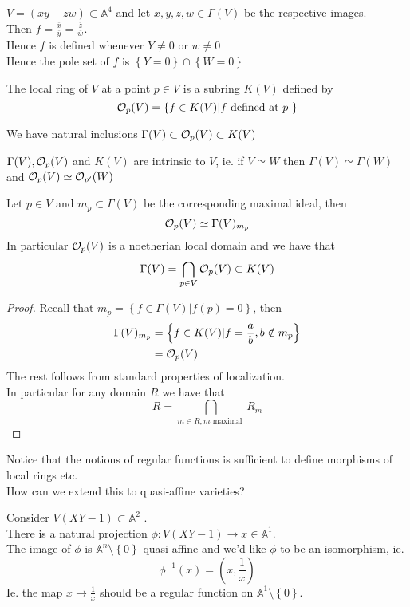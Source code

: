 \documentclass[../main.tex]{subfiles}
\begin{document}
\begin{exemple}
$V= ( xy-zw) \subset \mathbb{A}^{4}$ and let $ \overline{x}, \overline{y}, \overline{z},\overline{w}\in\Gamma( V) $ be the respective images.\\
Then $f= \frac{\overline{x}}{\overline{y}}= \frac{\overline{z}}{\overline{w}}$.\\
Hence $f$ is defined whenever $Y\neq 0$ or $w\neq 0$ \\
Hence the pole set of $f$ is $ \left\{ Y=0 \right\} \cap \left\{ W=0 \right\} $ 
\end{exemple}
\begin{defn}
	The local ring of $V$ at a point $p\in V$ is a subring $K( V) $ defined by
	\[ 
	\mathcal{O}_p( V) = \left\{ f\in K( V) | f \text{ defined at $p$  }  \right\} 
	\]
	
\end{defn}
We have natural inclusions $\Gamma( V) \subset \mathcal{O}_p( V) \subset K( V) $ 
\begin{rmq}
$\Gamma( V) , \mathcal{O}_p( V) $ and $K( V)  $ are intrinsic to $V$, ie. if $V\simeq W$ then $\Gamma( V) \simeq \Gamma( W) $ and $\mathcal{O}_p( V) \simeq \mathcal{O}_{p'} ( W) $ 
\end{rmq}
\begin{propo}
Let $p\in V$ and $m_p \subset \Gamma( V) $ be the corresponding maximal ideal, then
\[ 
\mathcal{O}_p( V) \simeq \Gamma( V)_{m_p}  
\]
In particular $\mathcal{O}_p( V) $ is a noetherian local domain and we have that
\[ 
\Gamma( V) = \bigcap_{p\in V}  \mathcal{O}_p( V) \subset K( V) 
\]

\end{propo}
\begin{proof}
Recall that $m_p= \left\{ f\in\Gamma( V) | f( p) =0 \right\} $, then
\begin{align*}
	\Gamma( V) _{m_p} &= \left\{ f\in K( V) | f = \frac{a}{b}, b \notin m_p \right\} \\
	&= \mathcal{O}_p( V) 
\end{align*}
The rest follows from standard properties of localization.\\
In particular for any domain $R$ we have that
\[ 
R= \bigcap_{m \in R, m \text{ maximal } } R_m
\]
\end{proof}
Notice that the notions of regular functions is sufficient to define morphisms of local rings etc.\\
How can we extend this to quasi-affine varieties?
\begin{exemple}
Consider $ V( XY-1) \subset \mathbb{A}^{2}$ .\\
There is a natural projection $\phi:V( XY-1) \to x\in \mathbb{A}^{1}$.\\
The image of $\phi$ is $ \mathbb{A}^{n}\setminus \left\{ 0 \right\} $ quasi-affine and we'd like $\phi$ to be an isomorphism, ie.
\[ 
\phi^{-1}( x) = ( x, \frac{1}{x}) 
\]
Ie. the map $x\to \frac{1}{x}$ should be a regular function on $ \mathbb{A}^{1}\setminus \left\{ 0 \right\} $.
\end{exemple}
\end{document}
